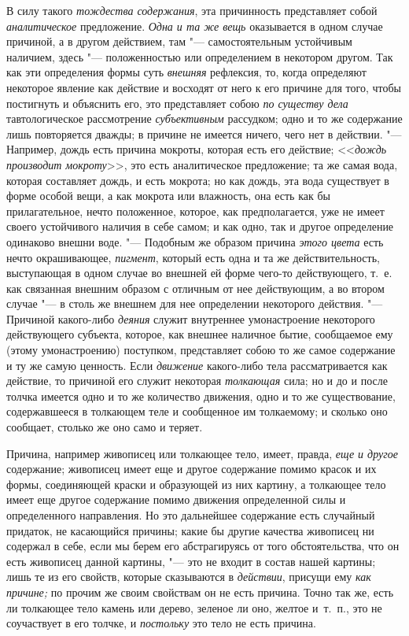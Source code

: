 В силу такого {\em тождества содержания}, эта причинность представляет собой
{\em аналитическое} предложение. {\em Одна и та же вещь} оказывается в одном
случае причиной, а в другом действием, там "--- самостоятельным устойчивым
наличием, здесь "--- положенностью или определением в некотором другом. Так как
эти определения формы суть {\em внешняя} рефлексия, то, когда определяют
некоторое явление как действие и восходят от него к его причине для того, чтобы
постигнуть и объяснить его, это представляет собою {\em по существу дела}
тавтологическое рассмотрение {\em субъективным} рассудком; одно и то же
содержание лишь повторяется дважды; в причине не имеется ничего, чего нет в
действии. "--- Например, дождь есть причина мокроты, которая есть его действие;
<<{\em дождь производит мокроту}>>, это есть аналитическое предложение; та же
самая вода, которая составляет дождь, и есть мокрота; но как дождь, эта вода
существует в форме особой вещи, а как мокрота или влажность, она есть как бы
прилагательное, нечто положенное, которое, как предполагается, уже не имеет
своего устойчивого наличия в себе самом; и как одно, так и другое определение
одинаково внешни воде. "--- Подобным же образом причина {\em этого цвета} есть
нечто окрашивающее, {\em пигмент}, который есть одна и та же действительность,
выступающая в одном случае во внешней ей форме чего-то действующего, т.~е. как
связанная внешним образом с отличным от нее действующим, а во втором случае
"--- в столь же внешнем для нее определении некоторого действия. "--- Причиной
какого-либо {\em деяния} служит внутреннее умонастроение некоторого
действующего субъекта, которое, как внешнее наличное бытие, сообщаемое ему
(этому умонастроению) поступком, представляет собою то же самое содержание и ту
же самую ценность. Если {\em движение} какого-либо тела рассматривается как
действие, то причиной его служит некоторая {\em толкающая} сила; но и до и
после толчка имеется одно и то же количество движения, одно и то же
существование, содержавшееся в толкающем теле и сообщенное им толкаемому; и
сколько оно сообщает, столько же оно само и теряет.

Причина, например живописец или толкающее тело, имеет, правда,
{\em еще и другое} содержание; живописец имеет еще и
другое содержание помимо красок и их формы, соединяющей краски и образующей
из них картину, а толкающее тело имеет еще другое содержание помимо
движения определенной силы и определенного направления. Но это дальнейшее
содержание есть случайный придаток, не касающийся причины; какие бы другие
качества живописец ни содержал в себе, если мы берем его абстрагируясь от
того обстоятельства, что он есть живописец данной картины, "--- это не входит
в состав нашей картины; лишь те из его свойств, которые сказываются в
{\em действии}, присущи ему {\em как причине;} по прочим же своим свойствам
он не есть причина. Точно так же, есть ли толкающее тело камень или дерево,
зеленое ли оно, желтое и~т.~п., это не соучаствует в его толчке, и
{\em постольку} это тело не есть причина.

